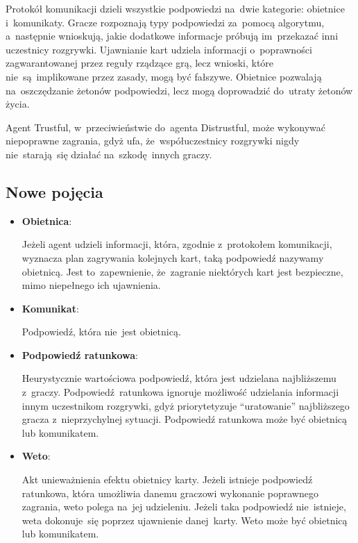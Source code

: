\documentclass[declaration,shortabstract,inz]{iithesis}
\begin{document}
Protokół komunikacji dzieli wszystkie podpowiedzi na~dwie kategorie: obietnice i~komunikaty. Gracze rozpoznają typy podpowiedzi za~pomocą algorytmu, a~następnie wnioskują, jakie dodatkowe informacje próbują im~przekazać inni uczestnicy rozgrywki. Ujawnianie kart udziela informacji o~poprawności zagwarantowanej przez reguły rządzące grą, lecz wnioski, które nie~są~implikowane przez zasady, mogą być fałszywe. Obietnice pozwalają na~oszczędzanie żetonów podpowiedzi, lecz mogą doprowadzić do~utraty żetonów życia.

Agent Trustful, w~przeciwieństwie do~agenta Distrustful, może wykonywać niepoprawne zagrania, gdyż ufa, że~współuczestnicy rozgrywki nigdy nie~starają~się działać na~szkodę innych graczy.

\subsection*{Nowe pojęcia}

\begin{itemize}
	\item \textbf{Obietnica}:
	
	Jeżeli agent udzieli informacji, która, zgodnie z~protokołem komunikacji, wyznacza plan zagrywania kolejnych kart, taką podpowiedź nazywamy obietnicą. Jest to~zapewnienie, że~zagranie niektórych kart jest bezpieczne, mimo niepełnego ich ujawnienia.
	
	\item \textbf{Komunikat}:
	
	Podpowiedź, która nie~jest obietnicą.
	
	\item \textbf{Podpowiedź ratunkowa}:
	
	Heurystycznie wartościowa podpowiedź, która jest udzielana najbliższemu z~graczy. Podpowiedź ratunkowa ignoruje możliwość udzielania informacji innym uczestnikom rozgrywki, gdyż priorytetyzuje ``uratowanie'' najbliższego gracza z~nieprzychylnej sytuacji. Podpowiedź ratunkowa może być obietnicą lub komunikatem.
	
	\newpage
	
	\item \textbf{Weto}:
	
	Akt unieważnienia efektu obietnicy karty. Jeżeli istnieje podpowiedź ratunkowa, która umożliwia danemu graczowi wykonanie poprawnego zagrania, weto polega na~jej udzieleniu. Jeżeli taka podpowiedź nie~istnieje, weta dokonuje~się poprzez ujawnienie danej karty. Weto może być obietnicą lub komunikatem.

\end{itemize}
\end{document}
